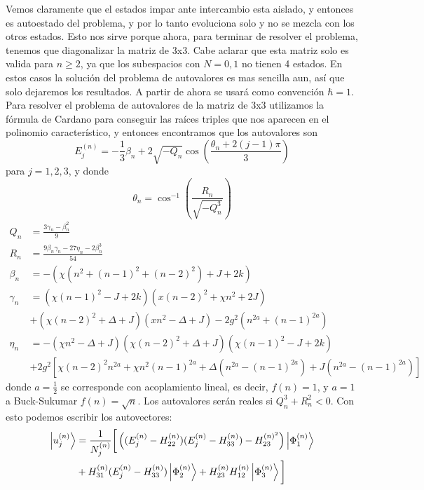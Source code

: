 Vemos claramente que el estados impar ante intercambio esta aislado, y entonces es autoestado del problema, y por lo tanto evoluciona solo y no se mezcla con los otros estados. Esto nos sirve porque ahora, para terminar de resolver el problema, tenemos que diagonalizar la matriz de 3x3. Cabe aclarar que esta matriz solo es valida para $n\geq 2$, ya que los subespacios con $N=0,1$ no tienen 4 estados. En estos casos la soluci\'on del problema de autovalores es mas sencilla aun, as\'i que solo dejaremos los resultados. A partir de ahora se usar\'a como convención $\hbar=1$. \newline
Para resolver el problema de autovalores de la matriz de 3x3 utilizamos la fórmula de Cardano para conseguir las ra\'ices triples que nos aparecen en el polinomio caracter\'istico, y entonces encontramos que los autovalores son
\begin{equation}
    E_j^{(n)}=-\frac{1}{3}\beta_n+2\sqrt{-Q_n}\cos{\left(\frac{\theta_n+2(j-1)\pi}{3}\right)}
\end{equation}
para $j=1,2,3$, y donde 
\begin{equation}
    \theta_n=\cos^{-1}\left(\frac{R_n}{\sqrt{-Q_n^3}}\right)
\end{equation}
\begin{align*}
    Q_n & = \frac{3\gamma_n-\beta_n^2}{9} \\
    R_n & = \frac{9\beta_n\gamma_n-27\eta_n-2\beta_n^3}{54} \\
    \beta_n & = - \left( \chi(n^2+(n-1)^2+(n-2)^2)+J+2k\right) \\
    \gamma_n & = (\chi(n-1)^2 - J + 2k)(x(n-2)^2+\chi n^2+2J) \\ 
    & +(\chi (n-2)^2+\Delta+J)(x n^2-\Delta+J)-2g^2(n^{2a}+(n-1)^{2a}) \\ 
    \eta_n &= -(\chi n^2-\Delta+J)(\chi(n-2)^2+\Delta+J)(\chi(n-1)^2-J+2k) \\
    &+2g^2 \left[  \chi(n-2)^2n^{2a}+\chi n^2(n-1)^{2a}+\Delta\left(n^{2a}-(n-1)^{2a}\right) +J(n^{2a}-(n-1)^{2a})\right]
\end{align*}
donde $a=\frac{1}{2}$ se corresponde con acoplamiento lineal, es decir, $f(n)=1$, y $a=1$ a Buck-Sukumar $f(n)=\sqrt{n}$. Los autovalores ser\'an reales si $Q_n^3+R_n^2<0$.
Con esto podemos escribir los autovectores:
\begin{equation}
    \begin{split}
        \ket{u_j^{(n)}} &= \frac{1}{N_j^{(n)}} \bigg[ \left((E_j^{(n)} - H_{22}^{(n)})(E_j^{(n)}-H_{33}^{(n)}) - H_{23}^{(n)^2} \right) \ket{\Phi_1^{(n)}} \\ &+ H_{31}^{(n)}(E_j^{(n)}-H_{33}^{(n)})\ket{\Phi_2^{(n)}} + H_{23}^{(n)}H_{12}^{(n)}\ket{\Phi_3^{(n)}}\bigg]
    \end{split}
\end{equation}
